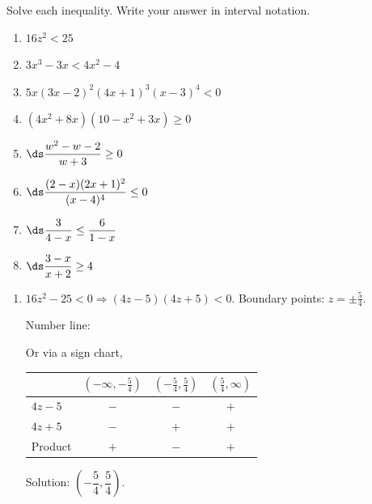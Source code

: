 \documentclass{ximera}
\begin{document}
\begin{problem}
Solve each inequality. Write your answer in interval notation.
\begin{enumerate}
  \item[(a)] $16z^2 < 25$
  \medskip
  \item[(b)] $3x^3-3x < 4x^2-4$
  \medskip
  \item[(c)] $5x(3x-2)^2(4x+1)^3(x-3)^4 < 0$
  \medskip
  \item[(d)] $(4x^2+8x)(10-x^2+3x)\geq 0$
  \medskip
  \item[(e)] $\ds\dfrac{w^2-w-2}{w+3}\geq 0$
  \medskip
  \item[(f)] $\ds\dfrac{(2-x)(2x+1)^2}{(x-4)^4}\leq 0$
  \medskip
  \item[(g)] $\ds\dfrac{3}{4-x}\leq \dfrac{6}{1-x}$
  \medskip
  \item[(h)] $\ds\dfrac{3-x}{x+2}\geq 4$
\end{enumerate}

\begin{solution}
\begin{enumerate}
  \item[(a)] $16z^2-25 < 0 \Rightarrow (4z-5)(4z+5)<0$. Boundary points: $z=\pm\tfrac{5}{4}$.

  Number line:
\begin{center}
\end{center}

  Or via a sign chart,
\begin{center}
\renewcommand{\arraystretch}{1.3}
\begin{tabular}{l|ccc}
 & $\left(-\infty,-\tfrac{5}{4}\right)$ & $\left(-\tfrac{5}{4},\tfrac{5}{4}\right)$ & $\left(\tfrac{5}{4},\infty\right)$ \\\hline
$4z-5$ & {\color{red}$-$} & {\color{red}$-$} & {\color{blue}$+$} \\
$4z+5$ & {\color{red}$-$} & {\color{blue}$+$} & {\color{blue}$+$} \\\hline
Product & {\color{blue}$+$} & {\color{red}$-$} & {\color{blue}$+$}
\end{tabular}
\end{center}
  Solution: $\left(-\dfrac{5}{4},\dfrac{5}{4}\right)$.


\end{enumerate}
\end{solution}
\end{problem}
\end{document}
